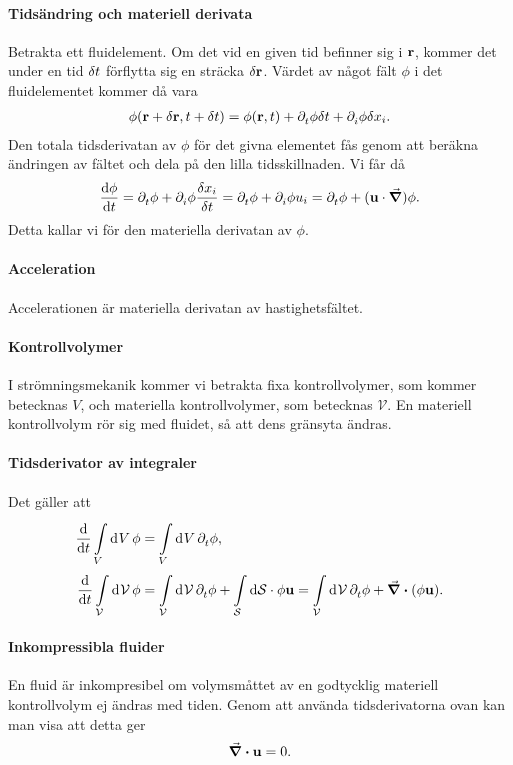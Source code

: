 \paragraph{Tidsändring och materiell derivata}
Betrakta ett fluidelement. Om det vid en given tid befinner sig i $\vb{r}$, kommer det under en tid $\delta t$ förflytta sig en sträcka $\delta \vb{r}$. Värdet av något fält $\phi$ i det fluidelementet kommer då vara
\begin{align*}
	\phi(\vb{r} + \delta \vb{r}, t + \delta t) = \phi(\vb{r}, t) + \partial_{t}^{}\phi\delta t + \partial_{i}^{}\phi\delta x_{i}.
\end{align*}
Den totala tidsderivatan av $\phi$ för det givna elementet fås genom att beräkna ändringen av fältet och dela på den lilla tidsskillnaden. Vi får då
\begin{align*}
	\dv{\phi}{t} = \partial_{t}^{}\phi + \partial_{i}^{}\phi\frac{\delta x_{i}}{\delta t} = \partial_{t}^{}\phi + \partial_{i}^{}\phi u_{i} = \partial_{t}^{}\phi + (\vb{u}\cdot\grad)\phi.
\end{align*}
Detta kallar vi för den materiella derivatan av $\phi$.

\paragraph{Acceleration}
Accelerationen är materiella derivatan av hastighetsfältet.

\paragraph{Kontrollvolymer}
I strömningsmekanik kommer vi betrakta fixa kontrollvolymer, som kommer betecknas $V$, och materiella kontrollvolymer, som betecknas $\mathcal{V}$. En materiell kontrollvolym rör sig med fluidet, så att dens gränsyta ändras.

\paragraph{Tidsderivator av integraler}
Det gäller att
\begin{align*}
	\dv{t}\int\limits_{V}^{}\dd[]{V}\phi                     &= \int\limits_{V}^{}\dd[]{V}\partial_{t}^{}\phi, \\
	\dv{t}\int\limits_{\mathcal{V}}^{}\dd[]{\mathcal{V}}\phi &= \int\limits_{\mathcal{V}}^{}\dd[]{\mathcal{V}}\partial_{t}^{}\phi + \int\limits_{\mathcal{S}}^{}\dd{\vb{\mathcal{S}}}\cdot \phi\vb{u} = \int\limits_{\mathcal{V}}^{}\dd[]{\mathcal{V}}\partial_{t}^{}\phi + \div(\phi\vb{u}).
\end{align*}

\paragraph{Inkompressibla fluider}
En fluid är inkompresibel om volymsmåttet av en godtycklig materiell kontrollvolym ej ändras med tiden. Genom att använda tidsderivatorna ovan kan man visa att detta ger
\begin{align*}
	\div{\vb{u}} = 0.
\end{align*}


